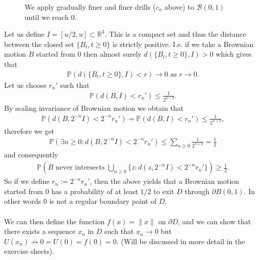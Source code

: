 \documentclass[../mainfile.tex]{subfiles}
\begin{document}
\begin{exmp}
\begin{figure}[hbtp]
\caption{We apply gradually finer and finer drills ($c_n$ above) to $\mathcal{B}(0,1)$ until we reach $0$.}
\end{figure}
\newpage
Let us define $I=[u/2,u] \subset \mathbb{R}^3$. This is a compact set and thus the distance between the closed set $\{B_t, t \geq 0\}$ is strictly positive. I.e. if we take a Brownian motion $B$ started from $0$ then almost surely $d(\{B_t, t \geq 0\}, I) >0$ which gives that
\begin{align*}
 \mathbb{P}(d( \{B_t, t \geq 0\}, I) <r ) \to 0 \text{ as } r \to 0.
\end{align*}
Let us choose $r_n'$ such that \begin{align*}
\mathbb{P}(d(B,I) < r_n') \leq \frac{1}{2^{n+2}}.
\end{align*}
By scaling invariance of Brownian motion we obtain that 
\begin{align*}
\mathbb{P}(d(B,2^{-n}I) < 2^{-n} r_n') = \mathbb{P}(d(B,I) < r_n') \leq \frac{1}{2^{n+2}},
\end{align*}
therefore we get
\begin{align*}
\mathbb{P}( \exists n \geq 0 : d(B,2^{-n}I) < 2^{-n}r_n') \leq \sum_{n \geq 0} \frac{1}{2^{n+2}}= \frac{1}{2}
\end{align*}
and consequently 
\begin{align*}
\mathbb{P}\left(B \text{ never intersects } \bigcup_{n \geq 0 } \{ z : d(z,2^{-n}I)< 2^{-n}r_n'\} \right) \geq \frac{1}{2}.
\end{align*}
So if we define $r_n:= 2^{-n}r_n'$, then the above yields that a Brownian motion started from $0$ has a probability of at least $1/2$ to exit $D$ through $\partial B(0,1)$. In other words $0$ is not a regular boundary point of $D$. \\
\\
We can then define the function $f(x)= \| x \|$ on $\partial D$, and we can show that there exists a sequence $x_n$ in $D$ such that $x_n \to 0$ but $U(x_n) \not\to 0 = U(0)=f(0)=0$. (Will be discussed in more detail in the exercise sheets).  
\end{exmp}
\newpage
\end{document}
